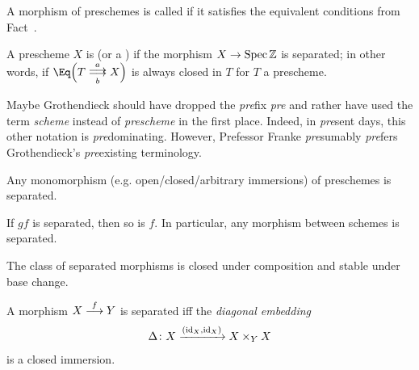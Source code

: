 \documentclass[a4paper,parskip=half,numbers=enddot, DIV=12]{scrreprt}
\begin{document}
\begin{defi}
	\begin{alphanumerate}
		\item {} A morphism of preschemes is called  if it satisfies the equivalent conditions from Fact~.
		\item A prescheme $X$ is  (or a ) if the morphism $X\morphism\Spec \IZ$ is separated; in other words, if $\Eq\Big(T\doublemorphism[a][b]X\Big)$ is always closed in $T$ for $T$ a prescheme.
	\end{alphanumerate}
\end{defi}
\begin{rem*}
	Maybe Grothendieck should have dropped the \emph{pre}fix \emph{pre} and rather have used the term \emph{scheme} instead of \emph{prescheme} in the first place. Indeed, in \emph{pre}sent days, this other notation is \emph{pre}dominating. However, Prefessor Franke \emph{pre}sumably \emph{pre}fers Grothendieck's \emph{pre}existing terminology.
\end{rem*}
\begin{fact}
	\begin{alphanumerate}
		\item {} Any monomorphism (e.g. open/closed/arbitrary immersions) of preschemes is separated.
		\item If $gf$ is separated, then so is $f$. In particular, any morphism between schemes is separated.
		\item The class of separated morphisms is closed under composition and stable under base change.
		\item A morphism $X\morphism[f]Y$ is separated iff the \emph{diagonal embedding} 
		\begin{align*}
			\Delta\colon X\xrightarrow{(\operatorname{id}_X,\operatorname{id}_X)}X\times_YX
		\end{align*}
		is a closed immersion.
	\end{alphanumerate}
\end{fact}
\end{document}
